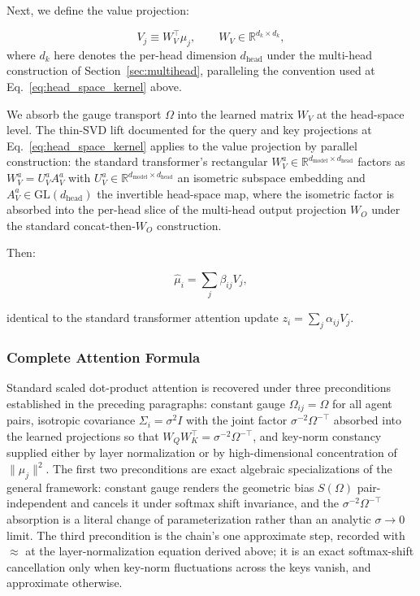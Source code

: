 \documentclass[twoside,11pt]{article}
\begin{document}
Next, we define the value projection:

\begin{equation}
V_j \equiv W_V^{\top}\mu_j, \qquad W_V \in \mathbb{R}^{d_k \times d_k},
\end{equation}
where $d_k$ here denotes the per-head dimension $d_{\text{head}}$ under the multi-head construction of Section~\ref{sec:multihead}, paralleling the convention used at Eq.~\eqref{eq:head_space_kernel} above.

We absorb the gauge transport $\Omega$ into the learned matrix $W_V$ at the head-space level. The thin-SVD lift documented for the query and key projections at Eq.~\eqref{eq:head_space_kernel} applies to the value projection by parallel construction: the standard transformer's rectangular $W_V^a \in \mathbb{R}^{d_{\text{model}} \times d_{\text{head}}}$ factors as $W_V^a = U_V^a A_V^a$ with $U_V^a \in \mathbb{R}^{d_{\text{model}} \times d_{\text{head}}}$ an isometric subspace embedding and $A_V^a \in \mathrm{GL}(d_{\text{head}})$ the invertible head-space map, where the isometric factor is absorbed into the per-head slice of the multi-head output projection $W_O$ under the standard concat-then-$W_O$ construction.

Then:

\begin{equation}
\boxed{\hat\mu_i = \sum_j \beta_{ij} V_j},
\end{equation}

identical to the standard transformer attention update $z_i = \sum_j \alpha_{ij} V_j$.

\subsubsection{Complete Attention Formula}

Standard scaled dot-product attention is recovered under three preconditions established in the preceding paragraphs: constant gauge $\Omega_{ij} = \Omega$ for all agent pairs, isotropic covariance $\Sigma_i = \sigma^2 I$ with the joint factor $\sigma^{-2}\Omega^{-\top}$ absorbed into the learned projections so that $W_Q W_K^\top = \sigma^{-2}\Omega^{-\top}$, and key-norm constancy supplied either by layer normalization or by high-dimensional concentration of $\|\mu_j\|^2$. The first two preconditions are exact algebraic specializations of the general framework: constant gauge renders the geometric bias $S(\Omega)$ pair-independent and cancels it under softmax shift invariance, and the $\sigma^{-2}\Omega^{-\top}$ absorption is a literal change of parameterization rather than an analytic $\sigma \to 0$ limit. The third precondition is the chain's one approximate step, recorded with $\approx$ at the layer-normalization equation derived above; it is an exact softmax-shift cancellation only when key-norm fluctuations across the keys vanish, and approximate otherwise.
\end{document}
